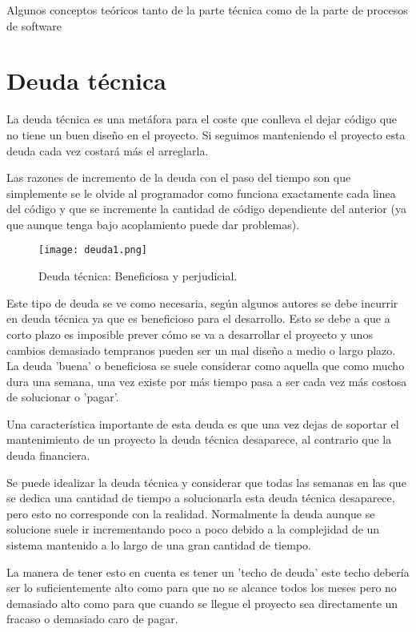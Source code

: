 
Algunos conceptos teóricos tanto de la parte técnica como de la parte de procesos de software


\section{Deuda técnica}

La deuda técnica es una metáfora para el coste que conlleva el dejar código que no tiene un buen diseño en el proyecto. Si seguimos manteniendo el proyecto esta deuda cada vez costará más el arreglarla.

Las razones de incremento de la deuda con el paso del tiempo son que simplemente se le olvide al programador como funciona exactamente cada linea del código y que se incremente la cantidad de código dependiente del anterior (ya que aunque tenga bajo acoplamiento puede dar problemas).

\begin{figure}
	\centering
	\texttt{[image: deuda1.png]}
	\caption{Deuda técnica: Beneficiosa y perjudicial.}\label{fig:deuda1.png}
\end{figure}


Este tipo de deuda se ve como necesaria, según algunos autores se debe incurrir en deuda técnica ya que es beneficioso para el desarrollo. Esto se debe a que a corto plazo es imposible prever cómo se va a desarrollar el proyecto y unos cambios demasiado tempranos pueden ser un mal diseño a medio o largo plazo. La deuda 'buena' o beneficiosa se suele considerar como aquella que como mucho dura una semana, una vez existe por más tiempo pasa a ser cada vez más costosa de solucionar o 'pagar'.


Una característica importante de esta deuda es que una vez dejas de soportar el mantenimiento de un proyecto la deuda técnica desaparece, al contrario que la deuda financiera.

Se puede idealizar la deuda técnica y considerar que todas las semanas en las que se dedica una cantidad de tiempo a solucionarla esta deuda técnica desaparece, pero esto no corresponde con la realidad. Normalmente la deuda aunque se solucione suele ir incrementando poco a poco debido a la complejidad de un sistema mantenido a lo largo de una gran cantidad de tiempo.

La manera de tener esto en cuenta es tener un 'techo de deuda' este techo debería ser lo suficientemente alto como para que no se alcance todos los meses pero no demasiado alto como para que cuando se llegue el proyecto sea directamente un fracaso o demasiado caro de pagar.

